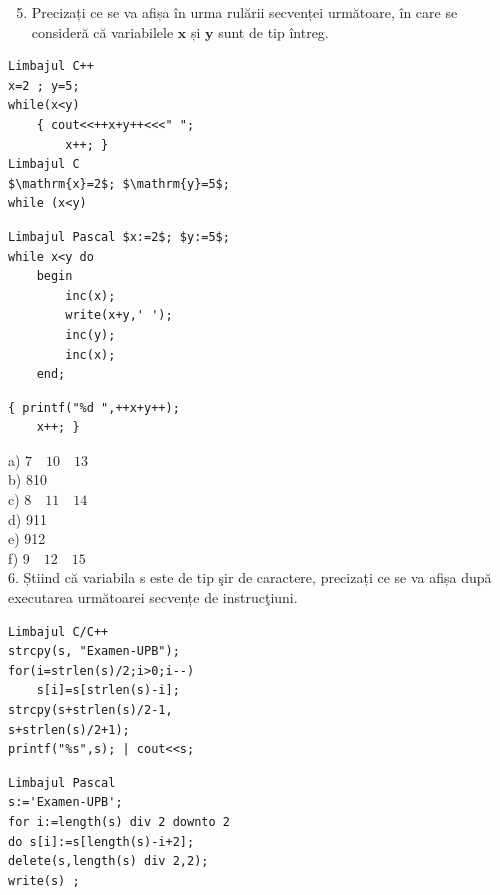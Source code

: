 \documentclass[10pt]{article}
\begin{document}
\begin{enumerate}
  \setcounter{enumi}{4}
  \item Precizați ce se va afișa în urma rulării secvenței următoare, în care se consideră că variabilele $\mathbf{x}$ și $\mathbf{y}$ sunt de tip întreg.
\end{enumerate}

\begin{verbatim}
Limbajul C++
x=2 ; y=5;
while(x<y)
    { cout<<++x+y++<<<" ";
        x++; }
Limbajul C
$\mathrm{x}=2$; $\mathrm{y}=5$;
while (x<y)
\end{verbatim}

\begin{verbatim}
Limbajul Pascal $x:=2$; $y:=5$;
while x<y do
    begin
        inc(x);
        write(x+y,' ');
        inc(y);
        inc(x);
    end;
\end{verbatim}

\begin{verbatim}
{ printf("%d ",++x+y++);
    x++; }
\end{verbatim}

a) $7 \quad 10 \quad 13$\\
b) 810\\
c) $8 \quad 11 \quad 14$\\
d) 911\\
e) 912\\
f) $9 \quad 12 \quad 15$\\
6. Știind că variabila s este de tip şir de caractere, precizați ce se va afișa după executarea următoarei secvențe de instrucţiuni.

\begin{verbatim}
Limbajul C/C++
strcpy(s, "Examen-UPB");
for(i=strlen(s)/2;i>0;i--)
    s[i]=s[strlen(s)-i];
strcpy(s+strlen(s)/2-1,
s+strlen(s)/2+1);
printf("%s",s); | cout<<s;
\end{verbatim}

\begin{verbatim}
Limbajul Pascal
s:='Examen-UPB';
for i:=length(s) div 2 downto 2
do s[i]:=s[length(s)-i+2];
delete(s,length(s) div 2,2);
write(s) ;
\end{verbatim}
\end{document}
